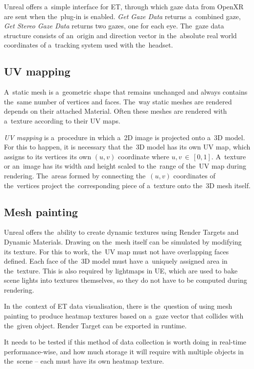 Unreal offers a~simple interface for ET, through which gaze data from OpenXR are sent when the~plug-in is enabled. \emph{Get Gaze Data} returns a~combined gaze, \emph{Get Stereo Gaze Data} returns two gazes, one for each eye. The~gaze data structure consists of an~origin and direction vector in the~absolute real world coordinates of a~tracking system used with the~headset. 

\subsection{UV mapping}
A~static mesh is a~geometric shape that remains unchanged and always contains the~same number of vertices and faces. The~way static meshes are rendered depends on their attached Material. Often these meshes are rendered with a~texture according to their UV maps.

\emph{UV mapping} is a~procedure in which a~2D image is projected onto a~3D model. For this to happen, it is necessary that the~3D model has its own UV map, which assigns to its vertices its own $(u, v)$ coordinate where $u,v$\,$\in$\,$[0, 1]$. A~texture or an~image has its width and height scaled to the~range of the~UV map during rendering. The~areas formed by connecting the~$(u, v)$ coordinates of the~vertices project the~corresponding piece of a~texture onto the~3D mesh itself.

\pagebreak{}
\subsection{Mesh painting}

Unreal offers the~ability to create dynamic textures using Render Targets and Dynamic Materials. Drawing on the~mesh itself can be simulated by modifying its texture. For this to work, the~UV map must not have overlapping faces defined. Each face of the~3D model must have a~uniquely assigned area in the~texture. This is also required by lightmaps in UE, which are used to bake scene lights into textures themselves, so they do not have to be computed during rendering.

In the~context of ET data visualisation, there is the~question of using mesh painting to produce heatmap textures based on a~gaze vector that collides with the~given object. Render Target can be exported in runtime.

It needs to be tested if this method of data collection is worth doing in real-time performance-wise, and how much storage it will require with multiple objects in the~scene -- each must have its own heatmap texture.

